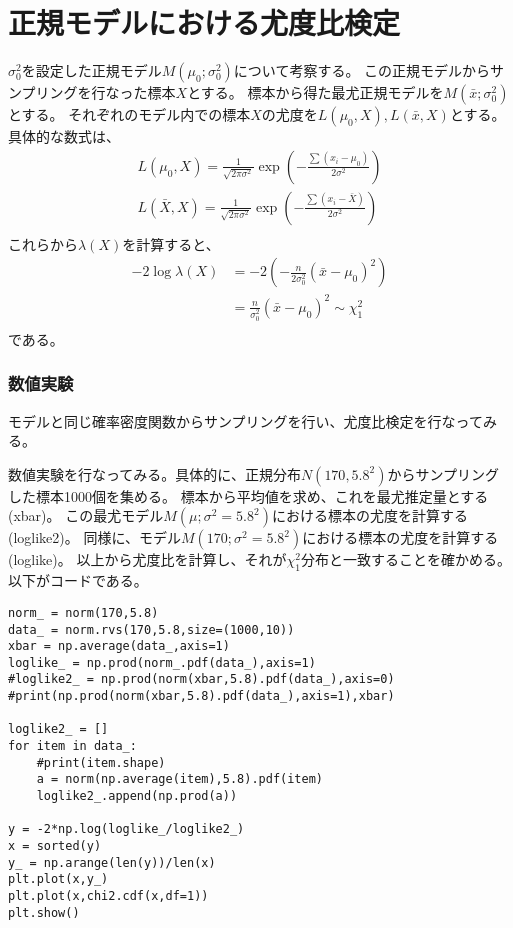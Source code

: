 \section{正規モデルにおける尤度比検定}

$\sigma^2_0$を設定した正規モデル$M(\mu_0;\sigma^2_0)$について考察する。
この正規モデルからサンプリングを行なった標本$X$とする。
標本から得た最尤正規モデルを$M(\bar{x};\sigma^2_0)$とする。
それぞれのモデル内での標本$X$の尤度を$L(\mu_0,X),L(\bar{x},X)$とする。
具体的な数式は、
\begin{align}
    L(\mu_0,X)=\frac{1}{\sqrt{2\pi\sigma^2}}\exp(-\frac{\sum(x_i-\mu_0)}{2\sigma^2})\\
    L(\bar{X},X)=\frac{1}{\sqrt{2\pi\sigma^2}}\exp(-\frac{\sum(x_i-\bar{X})}{2\sigma^2})\\
\end{align}
これらから$\lambda(X)$を計算すると、
\begin{align}
    -2\log\lambda(X) &= -2(-\frac{n}{2\sigma^2_0}(\bar{x}-\mu_0)^2) \\
    &= \frac{n}{\sigma^2_0}(\bar{x}-\mu_0)^2 \sim \chi^2_1 \\
\end{align}
である。

\subsubsection{数値実験}
モデルと同じ確率密度関数からサンプリングを行い、尤度比検定を行なってみる。

数値実験を行なってみる。具体的に、正規分布$N(170,5.8^2)$からサンプリングした標本1000個を集める。
標本から平均値を求め、これを最尤推定量とする(xbar)。
この最尤モデル$M(\mu;\sigma^2=5.8^2) $における標本の尤度を計算する(loglike2)。
同様に、モデル$M(170;\sigma^2=5.8^2)$における標本の尤度を計算する(loglike)。
以上から尤度比を計算し、それが$\chi^2_1$分布と一致することを確かめる。
以下がコードである。

\begin{lstlisting}
norm_ = norm(170,5.8)
data_ = norm.rvs(170,5.8,size=(1000,10))
xbar = np.average(data_,axis=1)
loglike_ = np.prod(norm_.pdf(data_),axis=1)
#loglike2_ = np.prod(norm(xbar,5.8).pdf(data_),axis=0)
#print(np.prod(norm(xbar,5.8).pdf(data_),axis=1),xbar)

loglike2_ = []
for item in data_:
    #print(item.shape)
    a = norm(np.average(item),5.8).pdf(item)
    loglike2_.append(np.prod(a))

y = -2*np.log(loglike_/loglike2_)
x = sorted(y)
y_ = np.arange(len(y))/len(x)
plt.plot(x,y_)
plt.plot(x,chi2.cdf(x,df=1))
plt.show()

\end{lstlisting}

